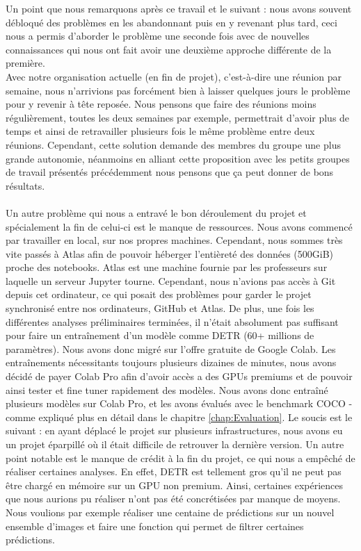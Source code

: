Un point que nous remarquons après ce travail et le suivant : nous avons souvent débloqué des problèmes en les abandonnant puis en y revenant plus tard, ceci nous a permis d'aborder le problème une seconde fois avec de nouvelles connaissances qui nous ont fait avoir une deuxième approche différente de la première.
\\
Avec notre organisation actuelle (en fin de projet), c'est-à-dire une réunion par semaine, nous n'arrivions pas forcément bien à laisser quelques jours le problème pour y revenir à tête reposée. Nous pensons que faire des réunions moins régulièrement, toutes les deux semaines par exemple, permettrait d'avoir plus de temps et ainsi de retravailler plusieurs fois le même problème entre deux réunions. Cependant, cette solution demande des membres du groupe une plus grande autonomie, néanmoins en alliant cette proposition avec les petits groupes de travail présentés précédemment nous pensons que ça peut donner de bons résultats.

\paragraph{}

Un autre problème qui nous a entravé le bon déroulement du projet et spécialement la fin de celui-ci est le manque de ressources. Nous avons commencé par travailler en local, sur nos propres machines. Cependant, nous sommes très vite passés à Atlas afin de pouvoir héberger l'entièreté des données (500GiB) proche des notebooks. Atlas est une machine fournie par les professeurs sur laquelle un serveur Jupyter tourne. Cependant, nous n'avions pas accès à Git depuis cet ordinateur, ce qui posait des problèmes pour garder le projet synchronisé entre nos ordinateurs, GitHub et Atlas. De plus, une fois les différentes analyses préliminaires terminées, il n'était absolument pas suffisant pour faire un entraînement d'un modèle comme DETR (60+ millions de paramètres). Nous avons donc migré sur l'offre gratuite de Google Colab. Les entraînements nécessitants toujours plusieurs dizaines de minutes, nous avons décidé de payer Colab Pro afin d'avoir accès a des GPUs premiums 
et de pouvoir ainsi tester et fine tuner rapidement des modèles. Nous avons donc entraîné plusieurs modèles sur Colab Pro, et les avons évalués avec le benchmark COCO - comme expliqué plus en détail dans le chapitre \ref{chap:Evaluation}. Le soucis est le suivant : en ayant déplacé le projet sur plusieurs infrastructures, nous avons eu un projet éparpillé où il était difficile de retrouver la dernière version. Un autre point notable est le manque de crédit à la fin du projet, ce qui nous a empêché de réaliser certaines analyses. En effet, DETR est tellement gros qu'il ne peut pas être chargé en mémoire sur un GPU non premium. Ainsi, certaines expériences que nous aurions pu réaliser n'ont pas été concrétisées par manque de moyens. Nous voulions par exemple réaliser une centaine de prédictions sur un nouvel ensemble d'images et faire une fonction qui permet de filtrer certaines prédictions.
